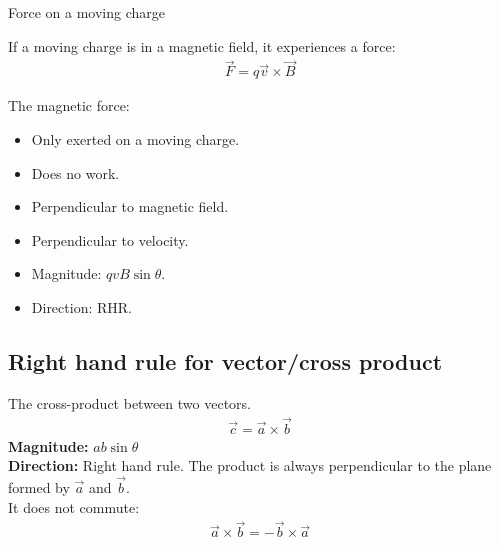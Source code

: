 \documentclass[aspectratio=169,
hyperref={colorlinks,urlcolor=blue}
]{beamer}
\begin{document}









\begin{bulletframe}{Force on a moving charge}
\item If a moving charge is in a magnetic field, it experiences a force:
\begin{align*}
\vec F = q \vec v \times \vec B
\end{align*}
\item The magnetic force:
\begin{itemize}
\item Only exerted on a moving charge.
\item Does no work.
\item Perpendicular to magnetic field.
\item Perpendicular to velocity.
\item Magnitude: $qvB\sin\theta$.
\item Direction: RHR.
\end{itemize}
\end{bulletframe}

\subsection{Right hand rule for vector/cross product}
\label{subsec:righthandruleforvector/cross product}
{
The cross-product between two vectors. 
\begin{align*}%
\vec c = \vec a \times \vec b
\end{align*}%
\textbf{Magnitude:} $ab\sin\theta$\\
\textbf{Direction:} Right hand rule. The product is always perpendicular to the plane formed by $\vec a$ and $\vec b$. \\
It does not commute:
\begin{align*}
\vec a \times \vec b = -\vec b \times \vec a
\end{align*}
}
{
\vspace{-1cm}

}




\end{document}
